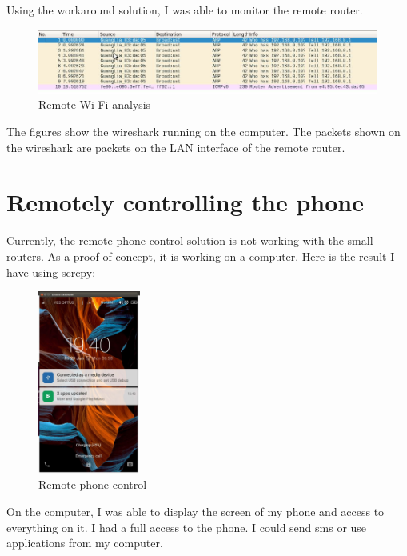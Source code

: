 Using the workaround solution, I was able to monitor the remote router. 

\begin{figure}[H]
\begin{center}
\includegraphics[width=\textwidth]{image/wireshark.jpg}%
\caption{Remote Wi-Fi analysis}%
\label{figure:wireshark}%
\end{center}
\end{figure}

The figures show the wireshark running on the computer. The packets shown on the wireshark are packets on the LAN interface of the remote router.



\section{Remotely controlling the phone}

Currently, the remote phone control solution is not working with the small routers. As a proof of concept, it is working on a computer.
Here is the result I have using scrcpy:
\begin{figure}[H]
\begin{center}
\includegraphics[width=0.3\textwidth]{image/phonecapture.jpg}%
\caption{Remote phone control}%
\label{figure:phone}%
\end{center}
\end{figure}

On the computer, I was able to display the screen of my phone and access to everything on it. I had a full access to the phone. I could send sms or use applications from my computer.
